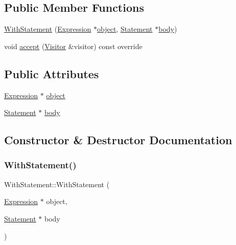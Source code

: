 \subsection*{Public Member Functions}
\begin{DoxyCompactItemize}
\item 
\hyperlink{struct_with_statement_a30feda3f34febbab2584ea274fcd507d}{With\+Statement} (\hyperlink{struct_expression}{Expression} $\ast$\hyperlink{struct_with_statement_a1563aab5799cbe5112e7a0429f4956bd}{object}, \hyperlink{struct_statement}{Statement} $\ast$\hyperlink{struct_with_statement_af7976ff82c99c995f603c2d32e8122ff}{body})
\item 
void \hyperlink{struct_with_statement_a07d3015de8ea5d3f27a0bab8719665f3}{accept} (\hyperlink{struct_visitor}{Visitor} \&visitor) const override
\end{DoxyCompactItemize}
\subsection*{Public Attributes}
\begin{DoxyCompactItemize}
\item 
\hyperlink{struct_expression}{Expression} $\ast$ \hyperlink{struct_with_statement_a1563aab5799cbe5112e7a0429f4956bd}{object}
\item 
\hyperlink{struct_statement}{Statement} $\ast$ \hyperlink{struct_with_statement_af7976ff82c99c995f603c2d32e8122ff}{body}
\end{DoxyCompactItemize}


\subsection{Constructor \& Destructor Documentation}
\mbox{\label{struct_with_statement_a30feda3f34febbab2584ea274fcd507d}} 
\subsubsection{\texorpdfstring{With\+Statement()}{WithStatement()}}
{\footnotesize\ttfamily With\+Statement\+::\+With\+Statement (\begin{DoxyParamCaption}\item[{\hyperlink{struct_expression}{Expression} $\ast$}]{object,  }\item[{\hyperlink{struct_statement}{Statement} $\ast$}]{body }\end{DoxyParamCaption})\hspace{0.3cm}{\ttfamily [inline]}}



